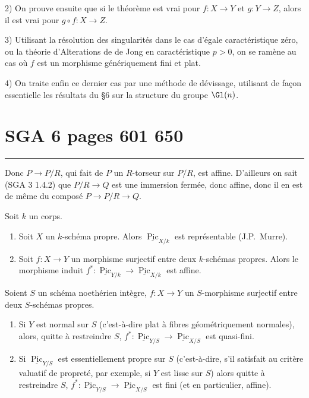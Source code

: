 2) On prouve ensuite que si le th\'eor\`eme est vrai pour $f : X \to Y$ et $g : Y \to Z$, alors il est vrai pour $g \circ f : X \to Z$.

3) Utilisant la r\'esolution des singularit\'es dans le cas d'\'egale caract\'eristique z\'ero, ou la th\'eorie d'Alterations de de Jong en caract\'eristique $p > 0$, on se ram\`ene au cas o\`u $f$ est un morphisme g\'en\'eriquement fini et plat.

4) On traite enfin ce dernier cas par une m\'ethode de d\'evissage, utilisant de fa\c con essentielle les r\'esultats du \S 6 sur la structure du groupe $\Gl(n)$.


\clearpage
{}
\section*{SGA 6 pages 601 650}
\setcounter{page}{601}

\hrule

\noindent
Donc $P \to P/R$, qui fait de $P$ un $R$-torseur sur $P/R$, est affine. D'ailleurs
on sait (SGA 3 1.4.2) que $P/R \to Q$ est une immersion fermée, donc affine,
donc il en est de même du composé $P \to P/R \to Q$.

\begin{cor}\label{cor:1.5} Soit $k$ un corps.
\begin{enumerate}[label={\alph*)}]
\item Soit $X$ un $k$-schéma propre. Alors $\underline{\operatorname{Pic}}_{X/k}$ est représentable\textup{ (J.P.~Murre)}.
\item Soit $f : X \to Y$ un morphisme surjectif entre deux $k$-schémas propres. Alors le morphisme induit $f^* : \underline{\operatorname{Pic}}_{Y/k} \to \underline{\operatorname{Pic}}_{X/k}$ est affine.
\end{enumerate}
\end{cor}

\begin{cor}\label{cor:1.6} Soient $S$ un schéma noethérien intègre, $f : X \to Y$ un $S$-morphisme surjectif entre deux $S$-schémas propres.
\begin{enumerate}[label={\alph*)}]
\item Si $Y$ est normal sur $S$ \textup{(}c'est-à-dire plat à fibres géométriquement normales\textup{)}, alors, quitte à restreindre $S$, $f^* : \underline{\operatorname{Pic}}_{Y/S} \to \underline{\operatorname{Pic}}_{X/S}$ est quasi-fini.
\item Si $\underline{\operatorname{Pic}}_{Y/S}$ est essentiellement propre sur $S$ \textup{(}c'est-à-dire, s'il satisfait au critère valuatif de propreté, par exemple, si $Y$ est lisse sur $S$\textup{)} alors quitte à restreindre $S$, $f^* : \underline{\operatorname{Pic}}_{Y/S} \to \underline{\operatorname{Pic}}_{X/S}$ est fini \textup{(}et en particulier, affine\textup{)}.
\end{enumerate}
\end{cor}

